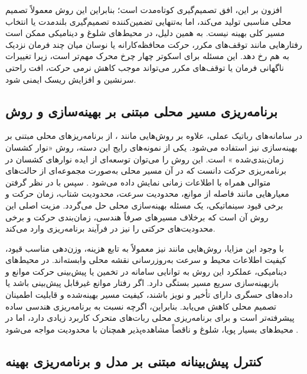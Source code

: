 افزون بر این، افق تصمیم‌گیری  کوتاه‌مدت است؛ بنابراین این روش معمولاً تصمیم محلی مناسبی تولید می‌کند، اما به‌تنهایی تضمین‌کننده تصمیم‌گیری بلندمدت یا انتخاب مسیر کلی بهینه نیست. به همین دلیل، در محیط‌های شلوغ و دینامیکی ممکن است رفتارهایی مانند توقف‌های مکرر، حرکت محافظه‌کارانه یا نوسان میان چند فرمان نزدیک به هم رخ دهد. این مسئله برای اسکوتر چهار چرخ محرک مهم‌تر است، زیرا تغییرات ناگهانی فرمان یا توقف‌های مکرر می‌تواند موجب کاهش نرمی حرکت، افت راحتی سرنشین و افزایش ریسک ایمنی شود.

\subsection{برنامه‌ریزی مسیر محلی مبتنی بر بهینه‌سازی و روش }

در سامانه‌های رباتیک عملی، علاوه بر روش‌هایی مانند ، از برنامه‌ریزهای محلی مبتنی بر بهینه‌سازی نیز استفاده می‌شود. یکی از نمونه‌های رایج این دسته، روش «نوار کشسان زمان‌بندی‌شده%
»
است. این روش را می‌توان توسعه‌ای از ایده نوارهای کشسان در برنامه‌ریزی حرکت دانست که در آن مسیر محلی به‌صورت مجموعه‌ای از حالت‌های متوالی همراه با اطلاعات زمانی نمایش داده می‌شود%
\cite{Quinlan1993ElasticBands,Rosmann2013TEB,Rosmann2015TEB}.
سپس با در نظر گرفتن معیارهایی مانند فاصله از موانع، محدودیت سرعت، محدودیت شتاب، زمان حرکت و برخی قیود سینماتیکی، یک مسئله بهینه‌سازی محلی حل می‌گردد. مزیت اصلی این روش آن است که برخلاف مسیرهای صرفاً هندسی، زمان‌بندی حرکت و برخی محدودیت‌های حرکتی را نیز در فرآیند برنامه‌ریزی وارد می‌کند.

با وجود این مزایا، روش‌هایی مانند  نیز معمولاً به تابع هزینه، وزن‌دهی مناسب قیود، کیفیت اطلاعات محیط و سرعت به‌روزرسانی نقشه محلی وابسته‌اند. در محیط‌های دینامیکی، عملکرد این روش به توانایی سامانه در تخمین یا پیش‌بینی حرکت موانع و بازبهینه‌سازی سریع مسیر بستگی دارد. اگر رفتار موانع غیرقابل پیش‌بینی باشد یا داده‌های حسگری دارای تأخیر و نویز باشند، کیفیت مسیر بهینه‌شده و قابلیت اطمینان تصمیم محلی کاهش می‌یابد. بنابراین، اگرچه  نسبت به برنامه‌ریزی هندسی ساده پیشرفته‌تر است و برای برنامه‌ریزی محلی ربات‌های متحرک کاربرد زیادی دارد، اما در محیط‌های بسیار پویا، شلوغ و ناقصاً مشاهده‌پذیر همچنان با محدودیت مواجه می‌شود%
\cite{Rosmann2013TEB,Rosmann2015TEB,LaValle2006Planning}.

\subsection{کنترل پیش‌بینانه مبتنی بر مدل و برنامه‌ریزی بهینه}

